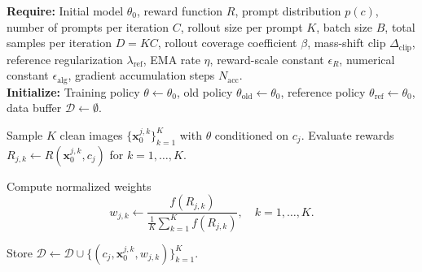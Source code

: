 \documentclass{article} %
\begin{document}
\begin{algorithm}[H]
    \caption{Exploration of reward mappings to probability ratio $w$}
    \label{alg:velocity-add-delete}
    \textbf{Require:} Initial model $\theta_0$, reward function $R$, prompt distribution $p(c)$, number of prompts per iteration $C$, rollout size per prompt $K$, batch size $B$, total samples per iteration $D = KC$, rollout coverage coefficient $\beta$, mass-shift clip $\Delta_{\mathrm{clip}}$, reference regularization $\lambda_{\mathrm{ref}}$, EMA rate $\eta$, reward-scale constant $\epsilon_R$, numerical constant $\epsilon_{\mathrm{alg}}$, gradient accumulation steps $N_{\mathrm{acc}}$.\\
    \textbf{Initialize:} Training policy $\theta \leftarrow \theta_0$, old policy $\theta_{\mathrm{old}} \leftarrow \theta_0$, reference policy $\theta_{\mathrm{ref}} \leftarrow \theta_0$, data buffer $\mathcal{D} \leftarrow \emptyset$.
    \begin{algorithmic}[1]
             
                \State Sample $K$ clean images $\{\mathbf{x}_0^{j,k}\}_{k=1}^{K}$ with $\theta$ conditioned on $c_j$.
                \State Evaluate rewards $R_{j,k} \leftarrow R(\mathbf{x}_0^{j,k}, c_j)$ for $k = 1, \dots, K$.
            \EndFor




                \State Compute normalized weights
                \[
                    w_{j,k} \leftarrow \frac{f(R_{j,k})}{\frac{1}{K}\sum_{k=1}^{K}f(R_{j,k})},
                    \quad k = 1, \dots, K.
                \]

                \State Store
                $\mathcal{D}\leftarrow\mathcal{D}\cup
                \{(c_j,\mathbf{x}_0^{j,k},w_{j,k})\}_{k=1}^{K}$.
            \EndFor


\end{algorithmic}
\end{algorithm}
\end{document}
